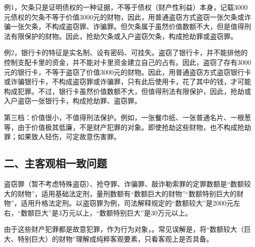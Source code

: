 例1，欠条只是证明债权的一种证据，不等于债权（财产性利益）本身，记载3000元债权的欠条不等于价值3000元的财物，因此，用普通盗窃方式盗窃一张欠条或诈骗一张欠条，不构成盗窃罪、诈骗罪。但欠条属于虽然价值数额不大，但是值得刑法有限保护的财物。因此，抢劫欠条或入户盗窃欠条，构成抢劫罪或盗窃罪。

例2，银行卡的特征是实名制、设有密码、可挂失。盗窃了银行卡，并不能排他的控制支配卡里的资金，并不能对卡里资金建立自己的占有。因此，盗窃了存有3000元的银行卡，不等于盗窃了价值3000元的财物。因此，用普通盗窃方式盗窃银行卡或诈骗银行卡，不构成盗窃罪或诈骗罪，只有此后使用卡，花了其中的钱，才可能构成犯罪。不过，银行卡虽然价值数额不大，但值得刑法有限保护，因此，抢劫或入户盗窃一张银行卡，构成抢劫罪、盗窃罪。

第三档：价值很小，不值得刑法保护。例如，一张餐巾纸、一张普通名片、一根葱等，由于价值极其低廉，不是财产犯罪的对象。即使抢劫这些财物，也不构成抢劫罪；如果致人轻伤，可定故意伤害罪。



\subsection*{二、主客观相一致问题}

盗窃罪（暂不考虑特殊盗窃）、抢夺罪、诈骗罪、敲诈勒索罪的定罪数额是“数额较大的财物”，适用基础法定刑，量刑数额有“数额巨大的财物”“数额特别巨大的财物”，适用升格法定刑。以盗窃罪为例，司法解释规定的“数额较大”是2000元左右，“数额巨大”是3万元以上，“数额特别巨大”是30万元以上。

由于这些财产犯罪都是故意犯罪，作为行为对象，。常见误解是，将“数额较大（巨大、特别巨大）的财物”理解成纯粹客观要素，只看客观上是否具备。


